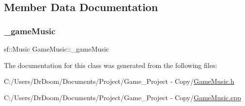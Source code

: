\subsection{Member Data Documentation}
\mbox{\label{class_game_music_a461fff6d2be45f65c7de7fdadcf0ae00}} 
\subsubsection{\texorpdfstring{\+\_\+game\+Music}{\_gameMusic}}
{\footnotesize\ttfamily sf\+::\+Music Game\+Music\+::\+\_\+game\+Music\hspace{0.3cm}{\ttfamily [private]}}



The documentation for this class was generated from the following files\+:\begin{DoxyCompactItemize}
\item 
C\+:/\+Users/\+Dr\+Doom/\+Documents/\+Project/\+Game\+\_\+\+Project -\/ Copy/\hyperlink{_game_music_8h}{Game\+Music.\+h}\item 
C\+:/\+Users/\+Dr\+Doom/\+Documents/\+Project/\+Game\+\_\+\+Project -\/ Copy/\hyperlink{_game_music_8cpp}{Game\+Music.\+cpp}\end{DoxyCompactItemize}
